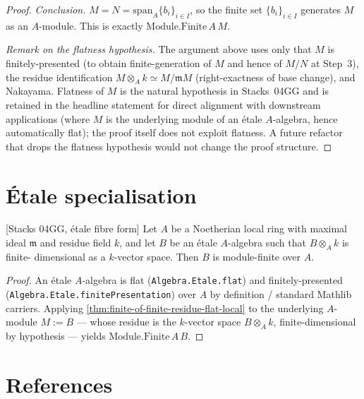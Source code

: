 \begin{proof}
  \emph{Conclusion.} \(M = N = \mathrm{span}_A \{b_i\}_{i \in I}\),
  so the finite set \(\{b_i\}_{i \in I}\) generates \(M\) as an
  \(A\)-module. This is exactly \(\mathrm{Module.Finite}\,A\,M\).

  \emph{Remark on the flatness hypothesis.} The argument above
  uses only that \(M\) is finitely-presented (to obtain
  finite-generation of \(M\) and hence of \(M/N\) at Step~3), the
  residue identification \(M \otimes_A k \simeq M / \mathfrak{m} M\)
  (right-exactness of base change), and Nakayama. Flatness of \(M\)
  is the natural hypothesis in Stacks~04GG and is retained in the
  headline statement for direct alignment with downstream
  applications (where \(M\) is the underlying module of an étale
  \(A\)-algebra, hence automatically flat); the proof itself does
  not exploit flatness. A future refactor that drops the flatness
  hypothesis would not change the proof structure.
\end{proof}

\section{Étale specialisation}

\begin{corollary}
  \label{cor:finite-of-finite-residue-etale-local}
  [Stacks 04GG, étale fibre form]
  Let \(A\) be a Noetherian local ring with maximal ideal
  \(\mathfrak{m}\) and residue field \(k\), and let \(B\) be an
  étale \(A\)-algebra such that \(B \otimes_A k\) is finite-
  dimensional as a \(k\)-vector space. Then \(B\) is module-finite
  over \(A\).
\end{corollary}

\begin{proof}
  An étale \(A\)-algebra is flat
  (\texttt{Algebra.Etale.flat}) and finitely-presented
  (\texttt{Algebra.Etale.finitePresentation}) over \(A\) by
  definition / standard Mathlib carriers. Applying
  \cref{thm:finite-of-finite-residue-flat-local} to the underlying
  \(A\)-module \(M := B\) — whose residue is the \(k\)-vector
  space \(B \otimes_A k\), finite-dimensional by hypothesis —
  yields \(\mathrm{Module.Finite}\,A\,B\).
\end{proof}

\section{References}

